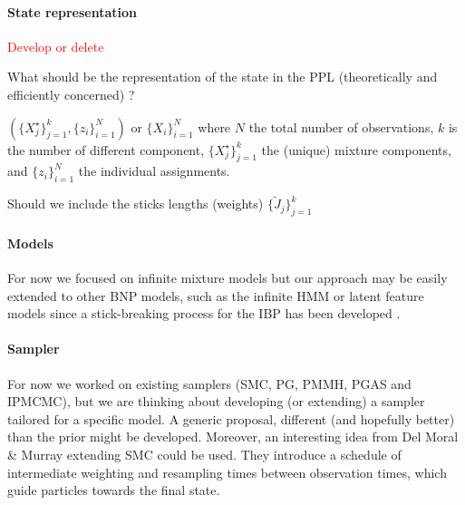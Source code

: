 
\paragraph{State representation}
\textcolor{red}{Develop or delete}

What should be the representation of the state in the PPL (theoretically and efficiently concerned) ?

$(\{X_j^\star\}_{j=1}^k, \{z_i\}_{i=1}^N)$ or $\{X_i\}_{i=1}^N$
where $N$ the total number of observations, $k$ is the number of different component, $\{X_j^\star\}_{j=1}^k$ the (unique) mixture components, and $\{z_i\}_{i=1}^N$ the individual assignments.

Should we include the sticks lengths (weights) $\{\tilde{J}_j\}_{j=1}^k$


\paragraph{Models}
For now we focused on infinite mixture models but our approach may be easily extended to other \gls{BNP} models, such as the infinite \acrlong{HMM} \cite{Beal02theinfinite} or latent feature models \cite{Ghahramani:2006tp} since a stick-breaking process for the \acrlong{IBP} has been developed \cite{stick-breaking-ibp}.

\paragraph{Sampler}
For now we worked on existing samplers (\gls{SMC}, \gls{PG}, \gls{PMMH}, \gls{PGAS} and \gls{IPMCMC}), but we are thinking about developing (or extending) a sampler tailored for a specific model. A generic proposal, different (and hopefully better) than the prior might be developed.
Moreover, an interesting idea from Del Moral \& Murray \cite{DelMoral:2015jk} extending \gls{SMC} could be used. They introduce a schedule of intermediate weighting and resampling times between observation times, which guide particles towards the final state.
